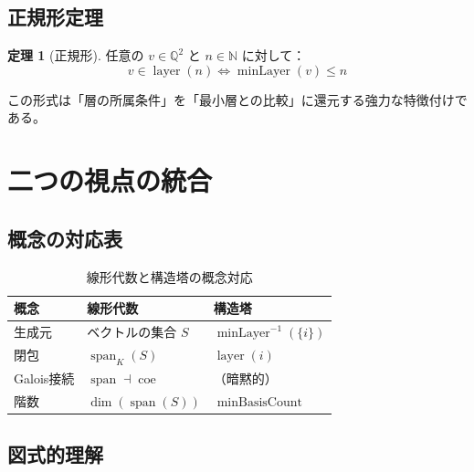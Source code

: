 \documentclass[a4paper,11pt]{ltjsarticle}
\theoremstyle{definition}
\newtheorem{theorem}[definition]{定理}
\begin{document}
\subsection{正規形定理}

\begin{theorem}[正規形]
  任意の $v \in \mathbb{Q}^2$ と $n \in \mathbb{N}$ に対して：
  \[
    v \in \operatorname{layer}(n) \iff \operatorname{minLayer}(v) \leq n
  \]
\end{theorem}

この形式は「層の所属条件」を「最小層との比較」に還元する強力な特徴付けである。

\section{二つの視点の統合}

\subsection{概念の対応表}

\begin{table}[htbp]
  \centering
  \begin{tabular}{lll}
    \hline
    \textbf{概念} & \textbf{線形代数} & \textbf{構造塔} \\
    \hline
    生成元 & ベクトルの集合 $S$ & $\operatorname{minLayer}^{-1}(\{i\})$ \\
    閉包 & $\operatorname{span}_K(S)$ & $\operatorname{layer}(i)$ \\
    Galois接続 & $\operatorname{span} \dashv \operatorname{coe}$ & （暗黙的） \\
    階数 & $\dim(\operatorname{span}(S))$ & $\operatorname{minBasisCount}$ \\
    \hline
  \end{tabular}
  \caption{線形代数と構造塔の概念対応}
  \label{tab:correspondence}
\end{table}

\subsection{図式的理解}
\end{document}

